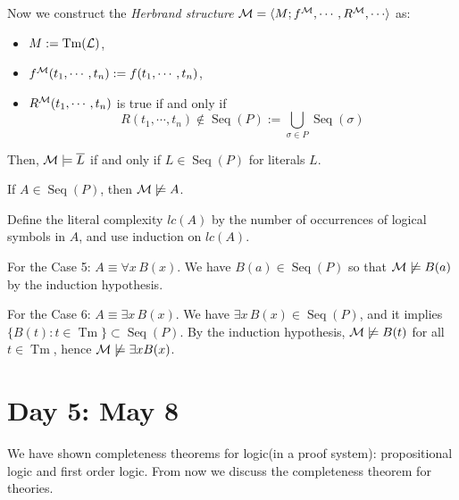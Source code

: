 \documentclass{../../small}
\DeclareMathOperator{\Tm}{Tm}
\DeclareMathOperator{\Seq}{Seq}
\begin{document}
Now we construct the \emph{Herbrand structure} $\cM=\<M;f^\cM,\cdots,R^\cM,\cdots\>$ as:
\begin{itemize}
\item $M:=\Tm(\cL)$,
\item $f^{\mathcal{M}}(t_1,\cdots,t_n):=f(t_1,\cdots,t_n)$,
\item $R^{\mathcal{M}}(t_1,\cdots,t_n)$ is true if and only if
\[R(t_1,\cdots,t_n)\notin\Seq(P):=\bigcup_{\sigma\in P}\Seq(\sigma)\]
\end{itemize}
Then, $\mathcal{M}\models\overline{L}$ if and only if $L\in\Seq(P)$ for literals $L$.
\begin{clm*}
If $A\in\Seq(P)$, then $\mathcal{M}\not\models A$.
\end{clm*}
\begin{pf}
Define the literal complexity $lc(A)$ by the number of occurrences of logical symbols in $A$, and use induction on $lc(A)$.

For the Case 5: $A\equiv\forall x\,B(x)$.
We have $B(a)\in\Seq(P)$ so that $\mathcal{M}\not\models B(a)$ by the induction hypothesis.

For the Case 6: $A\equiv\exists x\,B(x)$.
We have $\exists x\,B(x)\in\Seq(P)$, and it implies $\{B(t):t\in\Tm\}\subset\Seq(P)$.
By the induction hypothesis, $\mathcal{M}\not\models B(t)$ for all $t\in\Tm$, hence $\mathcal{M}\not\models\exists xB(x)$.
\end{pf}



\newpage
\section{Day 5: May 8}

We have shown completeness theorems for logic(in a proof system): propositional logic and first order logic.
From now we discuss the completeness theorem for theories.
\end{document}
